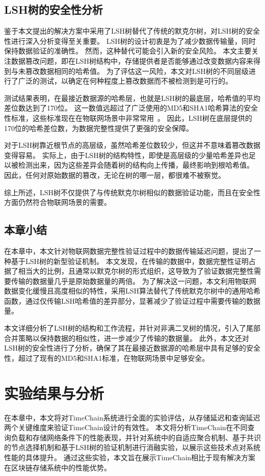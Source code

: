 \section{LSH树的安全性分析}
鉴于本文提出的解决方案中采用了LSH树替代了传统的默克尔树，对LSH树的安全性进行深入分析变得至关重要。
LSH树的设计初衷是为了减少数据传输量，同时保持数据验证的准确性。
然而，这种替代可能会引入新的安全风险。
本文主要关注数据篡改问题，即在LSH树结构中，存储提供者是否能够通过改变数据内容来得到与未篡改数据相同的哈希值。
为了评估这一风险，本文对LSH树的不同层级进行了广泛的测试，以确定在何种程度上篡改数据而不被检测到是可行的。

测试结果表明，在最接近数据源的哈希层，也就是LSH树的最底层，哈希值的平均差位数达到了170位。
这一数值远超过了广泛使用的MD5和SHA1哈希算法的安全性标准，这些标准现在在物联网场景中非常常用~\cite{chi2017hashing,landge2018secured}。
因此，LSH树在底层提供的170位的哈希差位数，为数据完整性提供了更强的安全保障。

对于LSH树靠近根节点的高层级，虽然哈希差位数较少，但这并不意味着篡改数据变得容易。
实际上，由于LSH树的结构特性，即使是高层级的少量哈希差异也足以被检测出来，因为这些差异会随着树的结构向上传播，最终影响到根哈希值。
因此，任何对原始数据的篡改，无论在树的哪一层，都很难不被察觉。

综上所述，LSH树不仅提供了与传统默克尔树相似的数据验证功能，而且在安全性方面仍然符合物联网场景的需要。

\section{本章小结}
在本章中，本文针对物联网数据完整性验证过程中的数据传输延迟问题，提出了一种基于LSH树的新型验证机制。
本文发现，在传输的数据中，数据完整性证明占据了相当大的比例，且通常以默克尔树的形式组织，这导致为了验证数据完整性需要传输的数据量几乎是原始数据量的两倍。
为了解决这一问题，本文利用物联网数据变化缓慢且高度相似的特性，采用LSH算法替代了传统默克尔树中的通用哈希函数，通过仅传输LSH哈希值的差异部分，显著减少了验证过程中需要传输的数据量。

本文详细分析了LSH树的结构和工作流程，并针对非满二叉树的情况，引入了尾部合并策略以保持数据的相似性，进一步减少了传输的数据量。
此外，本文还对LSH树的安全性进行了分析，确保了其在最接近数据源的哈希层中具有足够的安全性，超过了现有的MD5和SHA1标准，在物联网场景中足够安全。

\chapter{实验结果与分析}
在本章中，本文将对TimeChain系统进行全面的实验评估，从存储延迟和查询延迟两个关键维度来验证TimeChain设计的有效性。
本文将分析TimeChain在不同查询负载和存储网络条件下的性能表现，并针对系统中的自适应聚合机制、基于共识的节点选择机制和基于LSH树的验证机制进行消融实验，以展示这些技术点对系统性能的具体提升。
通过这些实验，本文旨在展示TimeChain相比于现有解决方案在区块链存储系统中的性能优势。

